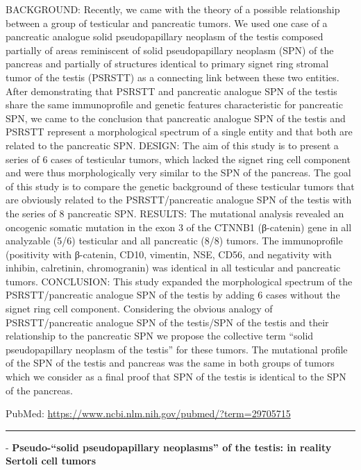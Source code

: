 \documentclass[]{article}
\begin{document}
BACKGROUND: Recently, we came with the theory of a possible relationship
between a group of testicular and pancreatic tumors. We used one case of
a pancreatic analogue solid pseudopapillary neoplasm of the testis
composed partially of areas reminiscent of solid pseudopapillary
neoplasm (SPN) of the pancreas and partially of structures identical to
primary signet ring stromal tumor of the testis (PSRSTT) as a connecting
link between these two entities. After demonstrating that PSRSTT and
pancreatic analogue SPN of the testis share the same immunoprofile and
genetic features characteristic for pancreatic SPN, we came to the
conclusion that pancreatic analogue SPN of the testis and PSRSTT
represent a morphological spectrum of a single entity and that both are
related to the pancreatic SPN. DESIGN: The aim of this study is to
present a series of 6 cases of testicular tumors, which lacked the
signet ring cell component and were thus morphologically very similar to
the SPN of the pancreas. The goal of this study is to compare the
genetic background of these testicular tumors that are obviously related
to the PSRSTT/pancreatic analogue SPN of the testis with the series of 8
pancreatic SPN. RESULTS: The mutational analysis revealed an oncogenic
somatic mutation in the exon 3 of the CTNNB1 (β-catenin) gene in all
analyzable (5/6) testicular and all pancreatic (8/8) tumors. The
immunoprofile (positivity with β-catenin, CD10, vimentin, NSE, CD56, and
negativity with inhibin, calretinin, chromogranin) was identical in all
testicular and pancreatic tumors. CONCLUSION: This study expanded the
morphological spectrum of the PSRSTT/pancreatic analogue SPN of the
testis by adding 6 cases without the signet ring cell component.
Considering the obvious analogy of PSRSTT/pancreatic analogue SPN of the
testis/SPN of the testis and their relationship to the pancreatic SPN we
propose the collective term ``solid pseudopapillary neoplasm of the
testis'' for these tumors. The mutational profile of the SPN of the
testis and pancreas was the same in both groups of tumors which we
consider as a final proof that SPN of the testis is identical to the SPN
of the pancreas.

PubMed: \url{https://www.ncbi.nlm.nih.gov/pubmed/?term=29705715}

{}

{}

\begin{center}\rule{0.5\linewidth}{\linethickness}\end{center}

 - \textbf{Pseudo-``solid pseudopapillary neoplasms'' of the testis: in
reality Sertoli cell tumors}
\end{document}
